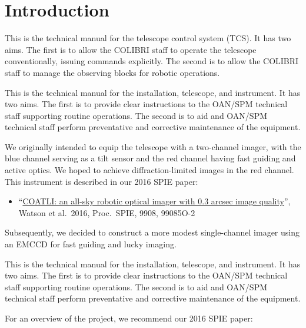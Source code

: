 \chapter{Introduction}
\label{chapter:introduction}

\ifcolibri

This is the technical manual for the {\projectname} telescope control system (TCS). It has two aims. The first is to allow the COLIBRI staff to operate the telescope conventionally, issuing commands explicitly. The second is to allow the COLIBRI staff to manage the observing blocks for robotic operations.

\fi

\ifcoatli

This is the technical manual for the {\projectname} installation, telescope, and instrument. It has two aims. The first is to provide clear instructions to the OAN/SPM technical staff supporting routine operations. The second is to aid {\projectname} and OAN/SPM technical staff perform preventative and corrective maintenance of the equipment.

We originally intended to equip the telescope with a two-channel imager, with the blue channel serving as a tilt sensor and the red channel having fast guiding and active optics. We hoped to achieve diffraction-limited images in the red channel. This instrument is described in our 2016 SPIE paper:

\begin{itemize}
\item “\href{bibliography/spie-coatli-2016.pdf}{COATLI: an all-sky robotic optical imager with 0.3 arcsec image quality}”,   Watson et al.\ 2016, Proc.\ SPIE, 9908, 99085O-2
\end{itemize}

Subsequently, we decided to construct a more modest single-channel imager using an EMCCD for fast guiding and lucky imaging.

\fi

\ifddoti

This is the technical manual for the {\projectname} installation, telescope, and instrument. It has two aims. The first is to provide clear instructions to the OAN/SPM technical staff supporting routine operations. The second is to aid {\projectname} and OAN/SPM technical staff perform preventative and corrective maintenance of the equipment.

For an overview of the {\projectname} project, we recommend our 2016 SPIE paper:

